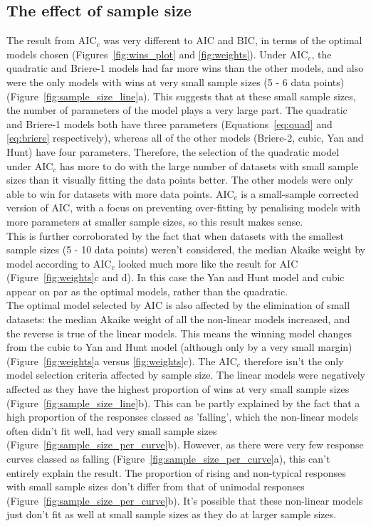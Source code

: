 \documentclass[11pt]{article}
\begin{document}
\subsection{The effect of sample size}
The result from AIC$_c$ was very different to AIC and BIC, in terms of the optimal models chosen (Figures~\ref{fig:wins_plot} and \ref{fig:weights}). Under AIC$_c$, the quadratic and Briere-1 models had far more wins than the other models, and also were the only models with wins at very small sample sizes (5 - 6 data points) (Figure~\ref{fig:sample_size_line}a). This suggests that at these small sample sizes, the number of parameters of the model plays a very large part. The quadratic and Briere-1 models both have three parameters (Equations~\ref{eq:quad} and \ref{eq:briere} respectively), whereas all of the other models (Briere-2, cubic, Yan and Hunt) have four parameters. Therefore, the selection of the quadratic model under AIC$_c$ has more to do with the large number of datasets with small sample sizes than it visually fitting the data points better. The other models were only able to win for datasets with more data points. AIC$_c$ is a small-sample corrected version of AIC, with a focus on preventing over-fitting by penalising models with more parameters at smaller sample sizes, so this result makes sense.
\\

This is further corroborated by the fact that when datasets with the smallest sample sizes (5 - 10 data points) weren't considered, the median Akaike weight by model according to AIC$_c$ looked much more like the result for AIC (Figure~\ref{fig:weights}c and d). In this case the Yan and Hunt model and cubic appear on par as the optimal models, rather than the quadratic. 
\\

The optimal model selected by AIC is also affected by the elimination of small datasets: the median Akaike weight of all the non-linear models increased, and the reverse is true of the linear models. This means the winning model changes from the cubic to Yan and Hunt model (although only by a very small margin) (Figure~\ref{fig:weights}a versus \ref{fig:weights}c). The AIC$_c$ therefore isn't the only model selection criteria affected by sample size. The linear models were negatively affected as they have the highest proportion of wins at very small sample sizes (Figure~\ref{fig:sample_size_line}b). This can be partly explained by the fact that a high proportion of the responses classed as 'falling', which the non-linear models often didn't fit well, had very small sample sizes (Figure~\ref{fig:sample_size_per_curve}b). However, as there were very few response curves classed as falling (Figure~\ref{fig:sample_size_per_curve}a), this can't entirely explain the result. The proportion of rising and non-typical responses with small sample sizes don't differ from that of unimodal responses (Figure~\ref{fig:sample_size_per_curve}b). It's possible that these non-linear models just don't fit as well at small sample sizes as they do at larger sample sizes.
\end{document}
